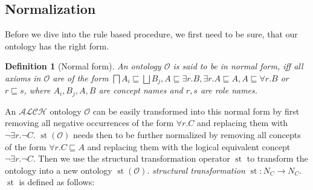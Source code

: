 \documentclass[titlepage]{article}
\newtheorem{definition}{Definition}
\DeclareMathOperator{\st}{st}
\begin{document}


\subsection{Normalization}\label{alg:norm}
Before we dive into the rule based procedure, we first need to be sure, that our ontology has the right form.
\begin{definition}[Normal form]
  An ontology $\mathcal{O}$ is said to be in normal form, iff all axioms in $\mathcal{O}$ are of the form
  $\bigsqcap A_i \sqsubseteq \bigsqcup B_j, A \sqsubseteq \exists r.B, \exists r.A \sqsubseteq A, A \sqsubseteq \forall r.B$ 
  or $r \sqsubseteq s$, where $A_i, B_j, A, B $ are concept names and $r,s$ are role names. \cite{article}
\end{definition}
An $\mathcal{ALCH}$ ontology $\mathcal{O}$ can be easily transformed into this normal form by first 
removing all negative occurrences of the form $\forall r. C$ and replacing them with $\neg \exists r. \neg C$.
$\st(\mathcal{O})$ needs then to be further normalized by removing all concepts of the form $\forall r.C \sqsubseteq A$ and
replacing them with the logical equivalent concept $\neg \exists r. \neg C $.
Then we use the structural transformation operator $\st$ to transform the ontology into a new ontology $\st(\mathcal{O})$.
\emph{structural transformation} $\st: N_C \rightarrow N_C$. $\st$ is defined as follows:
\end{document}
